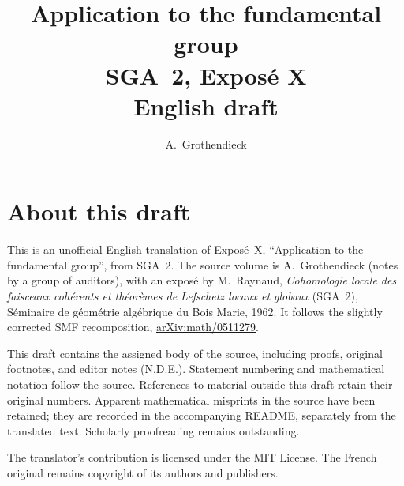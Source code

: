 \documentclass[11pt,a4paper,oneside]{amsbook}
\title[SGA~2, Exposé X (English draft)]{Application to the fundamental group\\
{\normalsize SGA~2, Exposé X\\English draft}}
\author{A.\ Grothendieck}
\date{}
\begin{document}
\frontmatter
\maketitle

\chapter*{About this draft}
This is an unofficial English translation of Expos\'e~X, ``Application to the fundamental group'',
from SGA~2. The source volume is A.\ Grothendieck
(notes by a group of auditors), with an expos\'e by M.\ Raynaud,
\textit{Cohomologie locale des faisceaux coh\'erents et th\'eor\`emes
de Lefschetz locaux et globaux} (SGA~2), S\'eminaire de g\'eom\'etrie
alg\'ebrique du Bois Marie, 1962. It follows the slightly corrected
SMF recomposition,
\href{https://arxiv.org/abs/math/0511279}{arXiv:math/0511279}.

This draft contains the assigned body of the source, including proofs,
original footnotes, and editor notes (N.D.E.). Statement numbering and
mathematical notation follow the source. References to material outside
this draft retain their original numbers. Apparent mathematical
misprints in the source have been retained; they are recorded in the
accompanying README, separately from the translated text. Scholarly
proofreading remains outstanding.

The translator's contribution is licensed under
the MIT License.
The French original remains copyright of its authors and publishers.

\tableofcontents
\mainmatter
\setcounter{chapter}{9}

\end{document}
